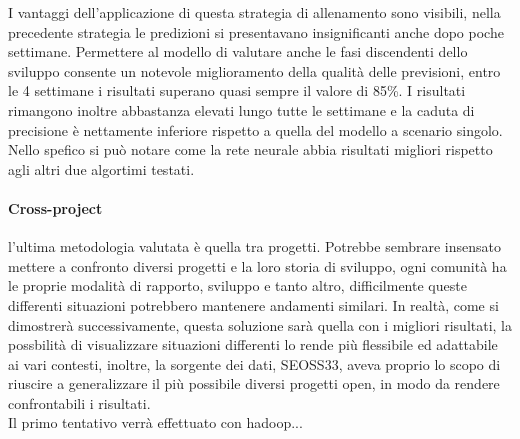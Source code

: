 \documentclass[%
    corpo=12pt,
    twoside,
    oldstyle,
    autoretitolo,
    greek,
    evenboxes,
]{toptesi}
\begin{document}
\begin{center}
   \label{tab:cross_version_hadoop}
\end{center}
I vantaggi dell'applicazione di questa strategia di allenamento sono visibili, nella precedente strategia le predizioni si presentavano insignificanti anche dopo poche settimane. Permettere al modello di valutare anche le fasi discendenti dello sviluppo consente un notevole miglioramento della qualità delle previsioni, entro le 4 settimane i risultati superano quasi sempre il valore di 85\%. I risultati rimangono inoltre abbastanza elevati lungo tutte le settimane e la caduta di precisione è nettamente inferiore rispetto a quella del modello a scenario singolo. Nello spefico si può notare come la rete neurale abbia risultati migliori rispetto agli altri due algortimi testati.

\paragraph{Cross-project} l'ultima metodologia valutata è quella tra progetti. Potrebbe sembrare insensato mettere a confronto diversi progetti e la loro storia di sviluppo, ogni comunità ha le proprie modalità di rapporto, sviluppo e tanto altro, difficilmente queste differenti situazioni potrebbero mantenere andamenti similari. In realtà, come si dimostrerà successivamente, questa soluzione sarà quella con i migliori risultati, la possbilità di visualizzare situazioni differenti lo rende più flessibile ed adattabile ai vari contesti, inoltre, la sorgente dei dati, SEOSS33, aveva proprio lo scopo di riuscire a generalizzare il più possibile diversi progetti open, in modo da rendere confrontabili i risultati.\\
Il primo tentativo verrà effettuato con hadoop...
\end{document}
